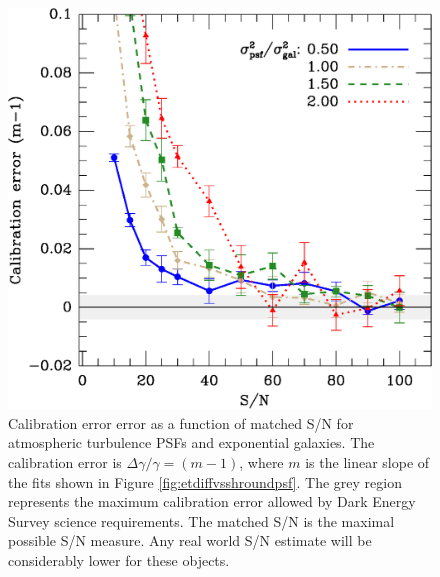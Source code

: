 \documentclass[10pt,preprint]{aastex}
\newcommand{\psf}{PSF}
\begin{document}
\begin{figure}[t] \centering
 \centering 
 \includegraphics[scale=0.65]{figures/set-s2n-et02-m-vs-shear.eps}

 \caption{Calibration error error as a function of matched S/N for atmospheric
 turbulence  \psf s and exponential galaxies.  The calibration error is
 $\Delta \gamma/\gamma = (m-1)$, where $m$ is the linear slope of the fits shown in
 Figure \ref{fig:etdiffvsshroundpsf}.  The grey region represents the 
 maximum calibration error allowed by Dark Energy Survey science
 requirements.  The matched S/N is the maximal possible S/N measure.  Any real
 world S/N estimate will be considerably lower for these objects.} 

 \label{fig:etcaliberr}

\end{figure}
\end{document}
